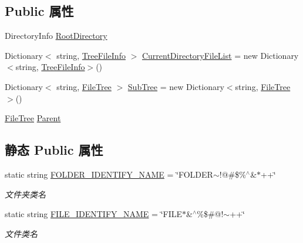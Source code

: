 \subsection*{Public 属性}
\begin{DoxyCompactItemize}
\item 
Directory\+Info \hyperlink{classcustom__cloud_1_1_file_tree_a9d128e90b1322df9b7eb7b054021ef63}{Root\+Directory}
\item 
Dictionary$<$ string, \hyperlink{classcustom__cloud_1_1_file_tree_1_1_tree_file_info}{Tree\+File\+Info} $>$ \hyperlink{classcustom__cloud_1_1_file_tree_a045fe31bf5ba0f592d24b784fb215a00}{Current\+Directory\+File\+List} = new Dictionary$<$string, \hyperlink{classcustom__cloud_1_1_file_tree_1_1_tree_file_info}{Tree\+File\+Info}$>$()
\item 
Dictionary$<$ string, \hyperlink{classcustom__cloud_1_1_file_tree}{File\+Tree} $>$ \hyperlink{classcustom__cloud_1_1_file_tree_a1be62d0d5cf1e81f75e00d4ad3b6d127}{Sub\+Tree} = new Dictionary$<$string, \hyperlink{classcustom__cloud_1_1_file_tree}{File\+Tree}$>$()
\item 
\hyperlink{classcustom__cloud_1_1_file_tree}{File\+Tree} \hyperlink{classcustom__cloud_1_1_file_tree_ad36aaec6c06ae1d76617f1353d979159}{Parent}
\end{DoxyCompactItemize}
\subsection*{静态 Public 属性}
\begin{DoxyCompactItemize}
\item 
static string \hyperlink{classcustom__cloud_1_1_file_tree_afe3147788fbe68099fe169c365c593ad}{F\+O\+L\+D\+E\+R\+\_\+\+I\+D\+E\+N\+T\+I\+F\+Y\+\_\+\+N\+A\+ME} = \char`\"{}F\+O\+L\+D\+E\+R$\sim$!@\#\$\%$^\wedge$\&$\ast$++\char`\"{}
\begin{DoxyCompactList}\small\item\em 文件夹类名 \end{DoxyCompactList}\item 
static string \hyperlink{classcustom__cloud_1_1_file_tree_aa2ff1d4def348ca6bf1da97babd3db73}{F\+I\+L\+E\+\_\+\+I\+D\+E\+N\+T\+I\+F\+Y\+\_\+\+N\+A\+ME} = \char`\"{}F\+I\+LE$\ast$\&$^\wedge$\%\$\#@!$\sim$++\char`\"{}
\begin{DoxyCompactList}\small\item\em 文件类名 \end{DoxyCompactList}\end{DoxyCompactItemize}
